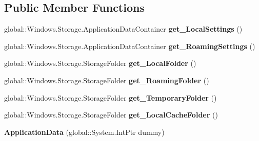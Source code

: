 \subsection*{Public Member Functions}
\begin{DoxyCompactItemize}
\item 
\mbox{\label{class_windows_1_1_storage_1_1_application_data_aa776fab90569a200a9729b7a18d9f4aa}} 
global\+::\+Windows.\+Storage.\+Application\+Data\+Container {\bfseries get\+\_\+\+Local\+Settings} ()
\item 
\mbox{\label{class_windows_1_1_storage_1_1_application_data_a27e78d63f97516acd70935e1472a8c98}} 
global\+::\+Windows.\+Storage.\+Application\+Data\+Container {\bfseries get\+\_\+\+Roaming\+Settings} ()
\item 
\mbox{\label{class_windows_1_1_storage_1_1_application_data_a4be66d1c6f347f25204f30fba6f63485}} 
global\+::\+Windows.\+Storage.\+Storage\+Folder {\bfseries get\+\_\+\+Local\+Folder} ()
\item 
\mbox{\label{class_windows_1_1_storage_1_1_application_data_a195408f98de3b9e189bb12ea66880cb6}} 
global\+::\+Windows.\+Storage.\+Storage\+Folder {\bfseries get\+\_\+\+Roaming\+Folder} ()
\item 
\mbox{\label{class_windows_1_1_storage_1_1_application_data_a3f3b3cf88635a6774215a68677f6e5a7}} 
global\+::\+Windows.\+Storage.\+Storage\+Folder {\bfseries get\+\_\+\+Temporary\+Folder} ()
\item 
\mbox{\label{class_windows_1_1_storage_1_1_application_data_a1f35e4887e3eb7dd667bf1900f0371ce}} 
global\+::\+Windows.\+Storage.\+Storage\+Folder {\bfseries get\+\_\+\+Local\+Cache\+Folder} ()
\item 
\mbox{\label{class_windows_1_1_storage_1_1_application_data_a870285ae522d1069764e2fec1208bffb}} 
{\bfseries Application\+Data} (global\+::\+System.\+Int\+Ptr dummy)
\item 

\end{DoxyCompactItemize}
